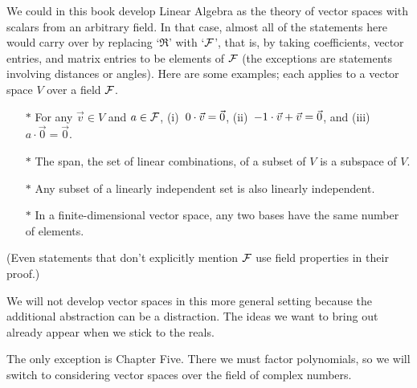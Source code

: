 We could in this book develop Linear Algebra as the theory of
vector spaces with scalars from an arbitrary field.
In that case, 
almost all of the statements here would carry over by replacing
`\( \Re \)' with `\( \mathcal{F} \)', that is, by
taking coefficients, vector entries,
and matrix entries to be elements of \( \mathcal{F} \)
(the exceptions are statements involving distances or angles).
Here are some examples; each applies to a vector space \( V \)
over a field \( \mathcal{F} \).
\begin{itemize}
  \item[$*$] For any \( \vec{v}\in V \) and \( a\in\mathcal{F} \),
  (i)~\( 0\cdot\vec{v}=\vec{0} \),
  (ii)~\( -1\cdot\vec{v}+\vec{v}=\vec{0} \),
  and (iii)~\( a\cdot\vec{0}=\vec{0} \).

  \item[$*$] The span, the set of linear combinations, of a subset of \( V \)
  is a subspace of \( V \).

  \item[$*$] Any subset of a linearly independent set is also 
     linearly independent.

  \item[$*$] In a finite-dimensional vector space, 
    any two bases have the same number of elements.
\end{itemize}
(Even statements that don't explicitly mention \( \mathcal{F} \) use
field properties in their proof.)

We will not develop vector spaces in this more general setting because
the additional abstraction can be a distraction.
The ideas we want to bring out already appear when we stick to the reals.

The only exception is Chapter Five.
There we must factor polynomials,
so we will switch to considering vector spaces over the
field of complex numbers.

